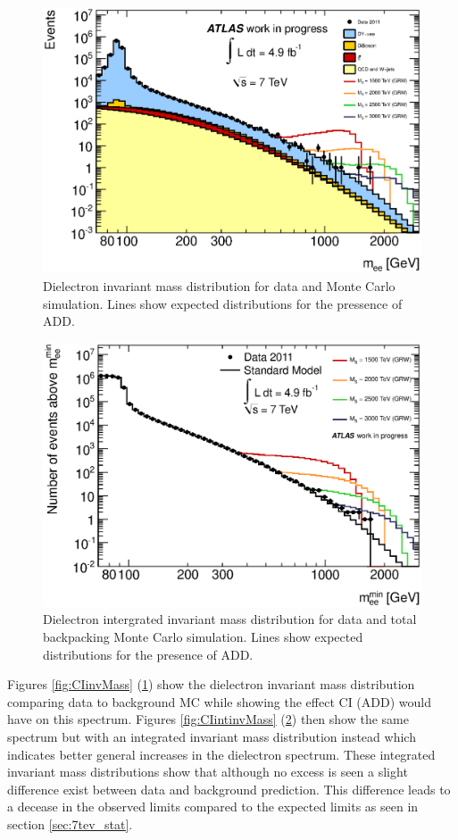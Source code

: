 	\begin{figure}[h!p]
	\centering
	\includegraphics[width=0.9\linewidth]{images/ADD_inv_mass.eps}
	\caption{Dielectron invariant mass distribution for data and Monte Carlo simulation. Lines show expected distributions for the pressence of ADD.}
	\label{fig:ADDinvMass}
	\end{figure}

	\begin{figure}[h!p]
	\centering
	\includegraphics[width=0.9\linewidth]{images/ADD_int_inv_mass.eps}
	\caption{Dielectron intergrated invariant mass distribution for data and total backpacking Monte Carlo simulation. Lines show expected distributions for the presence of ADD.}
	\label{fig:ADDintinvMass}
	\end{figure}


	Figures \ref{fig:CIinvMass} (\ref{fig:ADDinvMass}) show the dielectron invariant mass distribution comparing data to background MC while showing the effect CI (ADD) would have on this spectrum. Figures \ref{fig:CIintinvMass} (\ref{fig:ADDintinvMass}) then show the same spectrum but with an integrated invariant mass distribution instead which indicates better general increases in the dielectron spectrum. These integrated invariant mass distributions show that although no excess is seen a slight difference exist between data and background prediction. This difference leads to a decease in the observed limits compared to the expected limits as seen in section \ref{sec:7tev_stat}.





